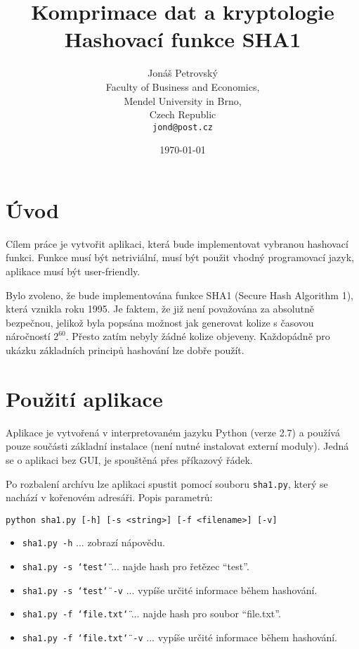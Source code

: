 \documentclass[a4paper]{article}
\begin{document}
\title{\vspace{-2.0cm}Komprimace dat a kryptologie \\ \textbf{Hashovací funkce SHA1}}
\author{Jonáš Petrovský\\
        Faculty of Business and Economics,\\
		Mendel University in Brno,\\
		Czech Republic \\
		\texttt{jond@post.cz}}
\date{\today}
\maketitle

\newcommand{\dqtt}[1]{\texttt{\char`\"}#1\texttt{\char`\"}}

\section{Úvod}
Cílem práce je vytvořit aplikaci, která bude implementovat vybranou hashovací funkci. Funkce musí být netriviální, musí být použit vhodný programovací jazyk, aplikace musí být user-friendly.

Bylo zvoleno, že bude implementována funkce SHA1 (Secure Hash Algorithm 1), která vznikla roku 1995. Je faktem, že již není považována za absolutně bezpečnou, jelikož byla popsána možnost jak generovat kolize s časovou náročností $2^{60}$. Přesto zatím nebyly žádné kolize objeveny. Každopádně pro ukázku základních principů hashování lze dobře použít.

\section{Použití aplikace}
Aplikace je vytvořená v interpretovaném jazyku Python (verze 2.7) a používá pouze součásti základní instalace (není nutné instalovat externí moduly). Jedná se o aplikaci bez GUI, je spouštěná přes příkazový řádek. 

Po rozbalení archívu lze aplikaci spustit pomocí souboru \texttt{sha1.py}, který se nachází v kořenovém adresáři. Popis parametrů:

\begin{verbatim}
python sha1.py [-h] [-s <string>] [-f <filename>] [-v]
\end{verbatim}

\begin{itemize}
\item \texttt{sha1.py -h} ... zobrazí nápovědu.
\item \texttt{sha1.py -s \dqtt{test}} ... najde hash pro řetězec ``test''.
\item \texttt{sha1.py -s \dqtt{test} -v} ... vypíše určité informace během hashování.
\item \texttt{sha1.py -f  \dqtt{file.txt}} ... najde hash pro soubor ``file.txt''.
\item \texttt{sha1.py -f  \dqtt{file.txt} -v} ... vypíše určité informace během hashování.
\end{itemize}
\end{document}

